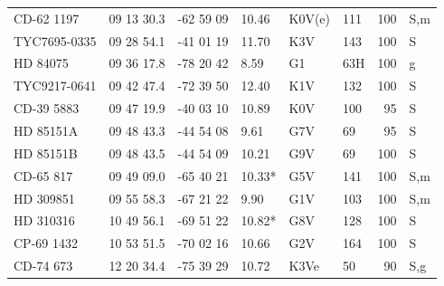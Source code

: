 \documentclass[11pt,twoside]{book}
\begin{document}
\begin{table}[!ht]
{\begin{tabular}{lcclllrl}
CD-62 1197    &09 13 30.3&    -62 59 09&       10.46&      K0V(e) &111&100&S,m\\
TYC7695-0335  &09 28 54.1&    -41 01 19&       11.70&        K3V  &143&100&S\\
HD 84075     &09 36 17.8&    -78 20 42&\hspace{2mm}8.59&G1&\hspace{2mm}63H&100&g\\
TYC9217-0641 &09 42 47.4&    -72 39 50 &      12.40&          K1V    &132&100&S\\
CD-39 5883    &09 47 19.9&    -40 03 10&      10.89  &          K0V  &100&95&S\\
HD  85151A   &09 48 43.3&    -44 54 08&\hspace{2mm}9.61 &     G7V&\hspace{2mm}69&95&S\\
HD  85151B   &09 48 43.5&    -44 54 09&     10.21 &     G9V    &\hspace{2mm}69&100&S\\
CD-65 817    &09 49 09.0&    -65 40 21&       10.33*&   G5V         &141&100&S,m\\
HD 309851    &09 55 58.3&    -67 21 22&\hspace{2mm}9.90&      G1V   &103&100&S,m\\
HD 310316    &10 49 56.1&    -69 51 22&       10.82*&    G8V        &128&100&S\\
CP-69 1432   &10 53 51.5&    -70 02 16&     10.66  &      G2V       &164&100&S\\
CD-74 673   &12 20 34.4  &   -75 39 29&    10.72&       K3Ve   &\hspace{2mm}50&90&S,g\\

\end{tabular}}
\end{table}
\end{document}
